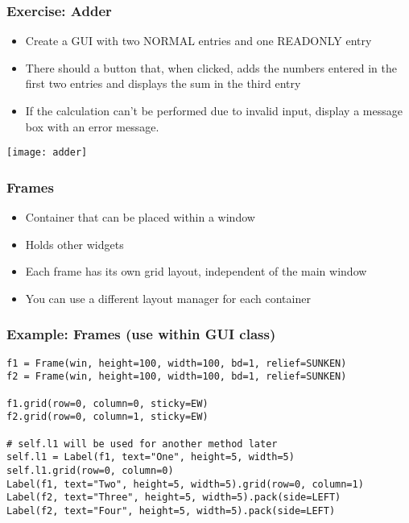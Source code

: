 \begin{frame}[fragile] \frametitle{Exercise: Adder}

\begin{itemize}
\item Create a GUI with two NORMAL entries and one READONLY entry
\item There should a button that, when clicked, adds the numbers entered in the first two entries and displays the sum in the third entry
\item If the calculation can't be performed due to invalid input, display a message box with an error message.

\end{itemize}

\begin{center}
\texttt{[image: adder]}
\end{center}
\end{frame}

\begin{frame}[fragile] \frametitle{Frames}

\begin{itemize}
\item Container that can be placed within a window
\item Holds other widgets
\item Each frame has its own grid layout, independent of the main window
\item You can use a different layout manager for each container
\end{itemize}
\end{frame}

\begin{frame}[fragile] \frametitle{Example: Frames (use within GUI class)}
\begin{lstlisting}
f1 = Frame(win, height=100, width=100, bd=1, relief=SUNKEN)
f2 = Frame(win, height=100, width=100, bd=1, relief=SUNKEN)

f1.grid(row=0, column=0, sticky=EW)
f2.grid(row=0, column=1, sticky=EW)

# self.l1 will be used for another method later
self.l1 = Label(f1, text="One", height=5, width=5)
self.l1.grid(row=0, column=0)
Label(f1, text="Two", height=5, width=5).grid(row=0, column=1)
Label(f2, text="Three", height=5, width=5).pack(side=LEFT)
Label(f2, text="Four", height=5, width=5).pack(side=LEFT)

\end{lstlisting}
\end{frame}

